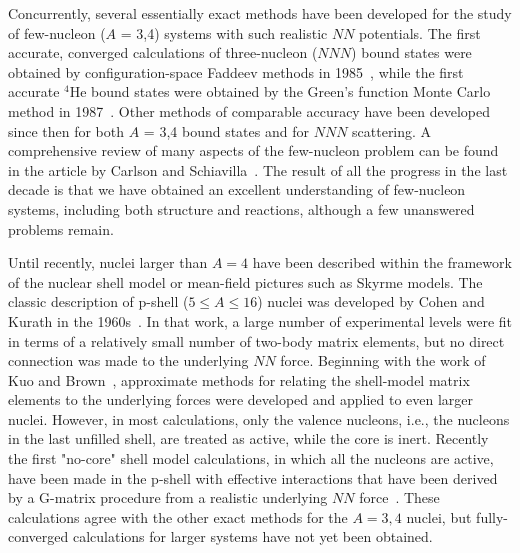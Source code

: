 Concurrently, several essentially exact methods have been developed for the
study of few-nucleon ($A$ = 3,4) systems with such realistic $N\!N$ potentials.
The first accurate, converged calculations of three-nucleon ($N\!N\!N$) bound 
states were obtained by configuration-space Faddeev methods in 
1985~\cite{CPFG85}, while the first accurate $^4$He bound states were 
obtained by the Green's function Monte Carlo method in 1987~\cite{C87}.
Other methods of comparable accuracy have been developed since 
then for both $A$ = 3,4 bound states and for $N\!N\!N$ scattering.
A comprehensive review of many aspects of the few-nucleon problem can be found
in the article by Carlson and Schiavilla~\cite{CS98}.
The result of all the progress in the last decade is that we have obtained an 
excellent understanding of few-nucleon systems, including both structure and 
reactions, although a few unanswered problems remain.

Until recently, nuclei larger than $A=4$ have been described within the 
framework of the nuclear shell model or mean-field pictures such as Skyrme 
models.
The classic description of p-shell ($5 \leq A \leq 16$)
nuclei was developed by Cohen and Kurath in the 1960s~\cite{CK65}.
In that work, a large number of experimental levels were fit in terms of a
relatively small number of two-body matrix elements, but no direct
connection was made to the underlying $N\!N$ force.
Beginning with the work of Kuo and Brown~\cite{KB66}, approximate methods 
for relating the shell-model matrix elements to the underlying forces were
developed and applied to even larger nuclei.  
However, in most calculations, only the valence nucleons, i.e., the 
nucleons in the last unfilled shell, are treated as active, while
the core is inert.
Recently the first "no-core" shell model calculations, in which all the 
nucleons are active, have been made in the p-shell with effective
interactions that have been derived by a G-matrix procedure from a realistic 
underlying $N\!N$ force~\cite{NVB00}.  
These calculations agree with the other exact methods for the $A=3,4$ 
nuclei, but fully-converged calculations for larger systems have not yet 
been obtained.

